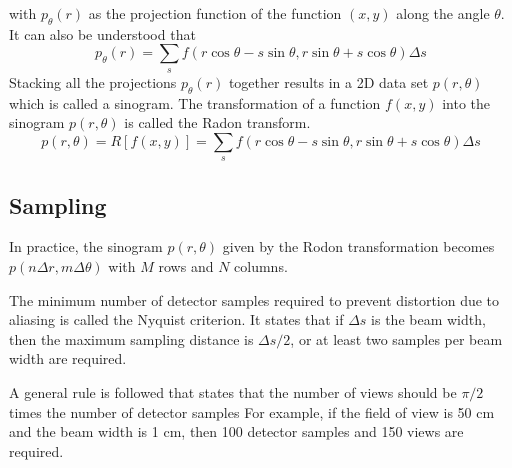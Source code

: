 \documentclass[../../../main.tex]{subfiles}
\begin{document}
with $p_\theta(r)$ as the projection function of the function $(x,y)$ along the angle $\theta$.
It can also be understood that
\begin{equation*}
    p_\theta(r)=\sum_s f \left( r \cos \theta-s \sin \theta,r \sin \theta+s \cos \theta \right) \Delta s
\end{equation*}
Stacking all the projections $p_\theta(r)$ together results in a 2D data set $p(r,\theta)$ which is called a sinogram.
The transformation of a function $f(x,y)$ into the sinogram $p(r,\theta)$ is called the Radon transform.
\begin{equation*}
    p(r,\theta)=R \left[ f(x,y) \right]=\sum_s f \left( r \cos \theta-s \sin \theta,r \sin \theta+s \cos \theta \right) \Delta s
\end{equation*}

\subsection{Sampling}
In practice, the sinogram $p(r,\theta)$ given by the Rodon transformation becomes $p(n\Delta  r,m\Delta\theta)$ with $M$ rows and $N$ columns.

The minimum number of detector samples required to prevent distortion due to aliasing is called the Nyquist criterion.
It states that if $\Delta s$ is the beam width, then the maximum sampling distance is $\Delta s/2$, or at least two samples per beam width are required. 

A general rule is followed that states that the number of views should be $\pi/2$ times the number of detector samples
For example, if the field of view is 50 cm and the beam width is 1 cm, then 100 detector samples and 150 views are required.
\end{document}
